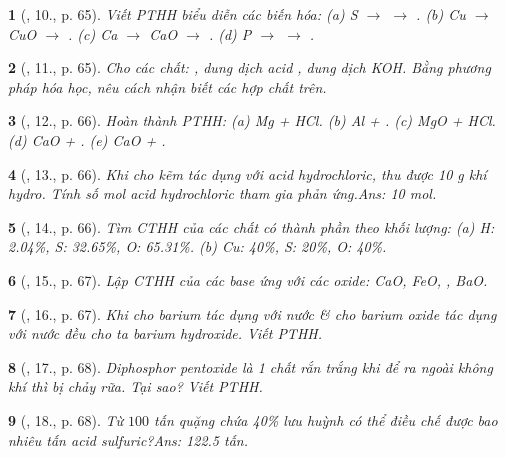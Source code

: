 \documentclass{article}
\newtheorem{baitoan}{}
\begin{document}
\begin{baitoan}[\cite{An_Hoa_Hoc_nang_cao_8_9}, 10., p. 65]
	Viết {\rm PTHH} biểu diễn các biến hóa: (a) {\rm S $\to$  $\to$ }. (b) {\rm Cu $\to$ CuO $\to$ }. (c) {\rm Ca $\to$ CaO $\to$ }. (d) {\rm P $\to$  $\to$ }.
\end{baitoan}

\begin{baitoan}[\cite{An_Hoa_Hoc_nang_cao_8_9}, 11., p. 65]
	Cho các chất: {\rm{}}, dung dịch acid {\rm{}}, dung dịch {\rm KOH}. Bằng phương pháp hóa học, nêu cách nhận biết các hợp chất trên.
\end{baitoan}

\begin{baitoan}[\cite{An_Hoa_Hoc_nang_cao_8_9}, 12., p. 66]
	Hoàn thành {\rm PTHH}: (a) {\rm Mg + HCl}. (b) {\rm Al + }. (c) {\rm MgO + HCl}. (d) {\rm CaO + }. (e) {\rm CaO + }.
\end{baitoan}

\begin{baitoan}[\cite{An_Hoa_Hoc_nang_cao_8_9}, 13., p. 66]
	Khi cho kẽm tác dụng với acid hydrochloric, thu được {\rm10 g} khí hydro. Tính số mol acid hydrochloric tham gia phản ứng.\hfill{\sf Ans: 10 mol.}
\end{baitoan}

\begin{baitoan}[\cite{An_Hoa_Hoc_nang_cao_8_9}, 14., p. 66]
	Tìm {\rm CTHH} của các chất có thành phần theo khối lượng: (a) {\rm H: 2.04\%, S: 32.65\%, O: 65.31\%}. (b) {\rm Cu: 40\%, S: 20\%, O: 40\%}.
\end{baitoan}

\begin{baitoan}[\cite{An_Hoa_Hoc_nang_cao_8_9}, 15., p. 67]
	Lập {\rm CTHH} của các base ứng với các oxide: {\rm CaO, FeO, , BaO}.
\end{baitoan}

\begin{baitoan}[\cite{An_Hoa_Hoc_nang_cao_8_9}, 16., p. 67]
	Khi cho barium tác dụng với nước \& cho barium oxide tác dụng với nước đều cho ta barium hydroxide. Viết {\rm PTHH}.
\end{baitoan}

\begin{baitoan}[\cite{An_Hoa_Hoc_nang_cao_8_9}, 17., p. 68]
	Diphosphor pentoxide là 1 chất rắn trắng khi để ra ngoài không khí thì bị chảy rữa. Tại sao? Viết {\rm PTHH}.
\end{baitoan}
\begin{baitoan}[\cite{An_Hoa_Hoc_nang_cao_8_9}, 18., p. 68]
	Từ $100$ tấn quặng chứa {\rm40\%} lưu huỳnh có thể điều chế được bao nhiêu tấn acid sulfuric?\hfill{\sf Ans: 122.5 tấn.}
\end{baitoan}
\end{document}
